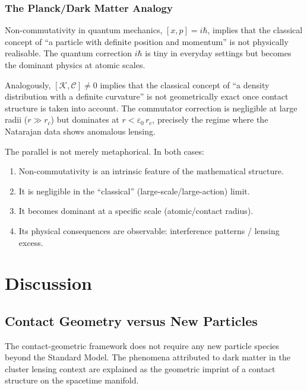 \documentclass[11pt,a4paper,openright]{book}
\theoremstyle{dm3thm}
\theoremstyle{dm3def}
\newcommand{\eps}{\varepsilon_0}
\newcommand{\rc}{r_c}
\newcommand{\KK}{\mathcal{K}}
\newcommand{\CC}{\mathcal{C}}
\begin{document}
\subsection{The Planck/Dark Matter Analogy}

Non-commutativity in quantum mechanics, $[x,p]=i\hbar$, implies that the
classical concept of ``a particle with definite position and momentum'' is
not physically realisable.  The quantum correction $i\hbar$ is tiny in
everyday settings but becomes the dominant physics at atomic scales.

Analogously, $[\KK,\CC]\neq 0$ implies that the classical concept of
``a density distribution with a definite curvature'' is not geometrically
exact once contact structure is taken into account.  The commutator
correction is negligible at large radii ($r\gg \rc$) but dominates at
$r < \eps\,\rc$, precisely the regime where the Natarajan data shows
anomalous lensing.

The parallel is not merely metaphorical.  In both cases:
\begin{enumerate}
  \item Non-commutativity is an intrinsic feature of the mathematical structure.
  \item It is negligible in the ``classical'' (large-scale/large-action) limit.
  \item It becomes dominant at a specific scale (atomic/contact radius).
  \item Its physical consequences are observable: interference patterns / lensing excess.
\end{enumerate}

\chapter{Discussion}
\label{ch:discussion}

\section{Contact Geometry versus New Particles}

The contact-geometric framework does not require any new particle species
beyond the Standard Model.  The phenomena attributed to dark matter in the
cluster lensing context are explained as the geometric imprint of a contact
structure on the spacetime manifold.
\end{document}

